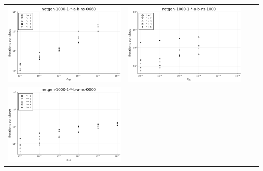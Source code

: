 \documentclass{article}
\begin{document}
\begin{landscape}
\begin{center}
\begin{longtable}{| c | c | c | c |}
\includegraphics[height=0.22\textheight]{itepst_fixlim_netgen-1000-1-_-a-b-ns-0660.png} &
\includegraphics[height=0.22\textheight]{itepst_fixlim_netgen-1000-1-_-a-b-ns-1000.png} \\
                \hline
\includegraphics[height=0.22\textheight]{itepst_fixlim_netgen-1000-1-_-b-a-ns-0000.png} &

\end{longtable}
\end{center}
\end{landscape}
\end{document}
